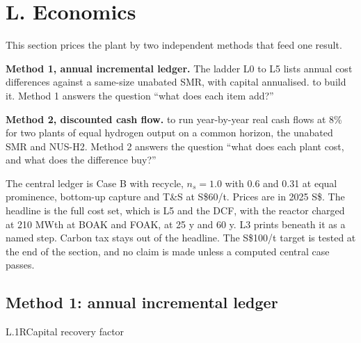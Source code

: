 \section{L. Economics}\label{sec:L}
This section prices the plant by two independent methods that feed one result.

\textbf{Method 1, annual incremental ledger.} The ladder L0 to L5 lists annual cost differences against a same-size unabated SMR, with capital annualised.  to  build it. Method 1 answers the question ``what does each item add?''

\textbf{Method 2, discounted cash flow.}  to  run year-by-year real cash flows at 8\% for two plants of equal hydrogen output on a common horizon, the unabated SMR and NUS-H2. Method 2 answers the question ``what does each plant cost, and what does the difference buy?''

The central ledger is Case B with recycle, $n_s=1.0$ with 0.6 and 0.31 at equal prominence, bottom-up capture and T\&S at S\$60/t. Prices are in 2025 S\$. The headline is the full cost set, which is L5 and the DCF, with the reactor charged at 210 MWth at BOAK and FOAK, at 25 y and 60 y. L3 prints beneath it as a named step. Carbon tax stays out of the headline. The S\$100/t target is tested at the end of the section, and no claim is made unless a computed central case passes.

\subsection*{Method 1: annual incremental ledger}

\begin{eqcard}{L.1}{R}{Capital recovery factor}
\end{eqcard}

